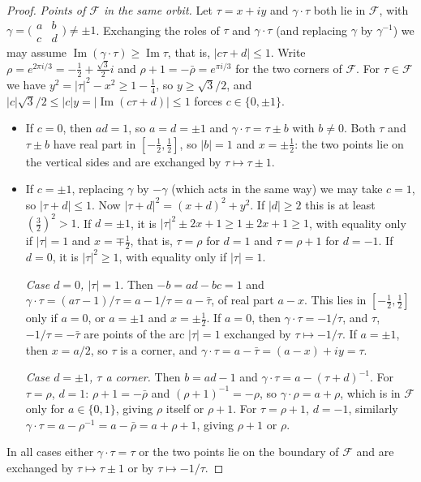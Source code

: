 \begin{proof}
\emph{Points of $\mathcal{F}$ in the same orbit.} Let $\tau = x + iy$ and $\gamma\cdot\tau$ both lie in $\mathcal{F}$, with $\gamma = \bigl(\begin{smallmatrix}a & b\\ c & d\end{smallmatrix}\bigr) \neq \pm1$.
Exchanging the roles of $\tau$ and $\gamma\cdot\tau$ (and replacing $\gamma$ by $\gamma^{-1}$) we may assume $\operatorname{Im}(\gamma\cdot\tau) \geq \operatorname{Im}\tau$, that is, $|c\tau + d| \leq 1$. Write
$\rho = e^{2\pi i/3} = -\frac12 + \frac{\sqrt3}{2}i$ and $\rho + 1 = -\bar\rho = e^{\pi i/3}$ for the two corners of $\mathcal{F}$. For $\tau \in \mathcal{F}$ we have $y^2 = |\tau|^2 - x^2 \geq 1 - \frac14$, so
$y \geq \sqrt3/2$, and $|c|\sqrt3/2 \leq |c|y = |\operatorname{Im}(c\tau + d)| \leq 1$ forces $c \in \{0, \pm1\}$.
\begin{itemize}
\item If $c = 0$, then $ad = 1$, so $a = d = \pm1$ and $\gamma\cdot\tau = \tau \pm b$ with $b \neq 0$. Both $\tau$ and $\tau \pm b$ have real part in $[-\frac12, \frac12]$, so $|b| = 1$ and $x = \pm\frac12$: the two points
lie on the vertical sides and are exchanged by $\tau \mapsto \tau \pm 1$.
\item If $c = \pm1$, replacing $\gamma$ by $-\gamma$ (which acts in the same way) we may take $c = 1$, so $|\tau + d| \leq 1$. Now $|\tau + d|^2 = (x + d)^2 + y^2$. If $|d| \geq 2$ this is at least
$(\frac32)^2 > 1$. If $d = \pm1$, it is $|\tau|^2 \pm 2x + 1 \geq 1 \pm 2x + 1 \geq 1$, with equality only if $|\tau| = 1$ and $x = \mp\frac12$, that is, $\tau = \rho$ for $d = 1$ and $\tau = \rho + 1$ for $d = -1$.
If $d = 0$, it is $|\tau|^2 \geq 1$, with equality only if $|\tau| = 1$.

\emph{Case $d = 0$, $|\tau| = 1$.} Then $-b = ad - bc = 1$ and $\gamma\cdot\tau = (a\tau - 1)/\tau = a - 1/\tau = a - \bar\tau$, of real part $a - x$. This lies in $[-\frac12, \frac12]$ only if $a = 0$, or $a = \pm1$ and
$x = \pm\frac12$. If $a = 0$, then $\gamma\cdot\tau = -1/\tau$, and $\tau$, $-1/\tau = -\bar\tau$ are points of the arc $|\tau| = 1$ exchanged by $\tau \mapsto -1/\tau$. If $a = \pm1$, then $x = a/2$, so
$\tau$ is a corner, and $\gamma\cdot\tau = a - \bar\tau = (a - x) + iy = \tau$.

\emph{Case $d = \pm1$, $\tau$ a corner.} Then $b = ad - 1$ and $\gamma\cdot\tau = a - (\tau + d)^{-1}$. For $\tau = \rho$, $d = 1$: $\rho + 1 = -\bar\rho$ and $(\rho + 1)^{-1} = -\rho$, so $\gamma\cdot\rho = a + \rho$,
which is in $\mathcal{F}$ only for $a \in \{0, 1\}$, giving $\rho$ itself or $\rho + 1$. For $\tau = \rho + 1$, $d = -1$, similarly $\gamma\cdot\tau = a - \rho^{-1} = a - \bar\rho = a + \rho + 1$, giving $\rho + 1$ or $\rho$.
\end{itemize}
In all cases either $\gamma\cdot\tau = \tau$ or the two points lie on the boundary of $\mathcal{F}$ and are exchanged by $\tau \mapsto \tau \pm 1$ or by $\tau \mapsto -1/\tau$.
\end{proof}

